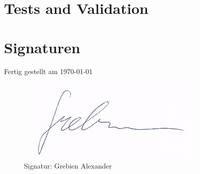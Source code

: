\chapter{Tests and Validation}


\newpage
\chapter{Signaturen}
    Fertig gestellt am \today \\
    \begin{figure}[H]
        \centering
        \includegraphics{LaTeX/pics/signature_grebien.png}
    	\caption{Signatur: Grebien Alexander}
    	\label{pic:signatur_grebien}
    \end{figure}
        
\listoffigures
\listoftables



